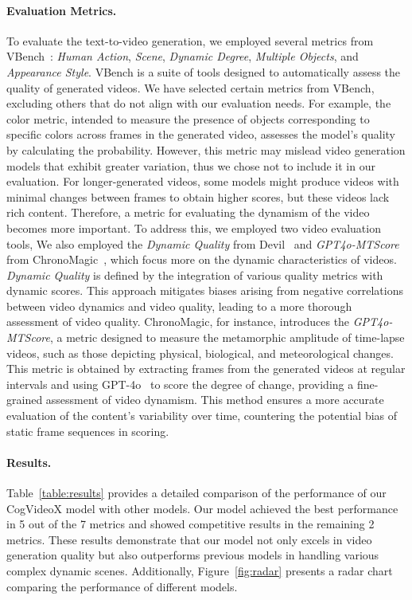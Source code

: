\paragraph{Evaluation Metrics.} To evaluate the text-to-video generation, we employed several metrics from VBench~\citep{huang2023vbench}: \emph{Human Action}, \emph{Scene}, \emph{Dynamic Degree}, \emph{Multiple Objects}, and \emph{Appearance Style}. VBench is a suite of tools designed to automatically assess the quality of generated videos. We have selected certain metrics from VBench, excluding others that do not align with our evaluation needs. For example, the color metric, intended to measure the presence of objects corresponding to specific colors across frames in the generated video, assesses the model's quality by calculating the probability. However, this metric may mislead video generation models that exhibit greater variation, thus we chose not to include it in our evaluation. For longer-generated videos, some models might produce videos with minimal changes between frames to obtain higher scores, but these videos lack rich content. Therefore, a metric for evaluating the dynamism of the video becomes more important. To address this, we employed two video evaluation tools, We also employed the \emph{Dynamic Quality} from Devil~\citep{liao2024evaluationtexttovideogenerationmodels} and \emph{GPT4o-MTScore} from ChronoMagic~\citep{yuan2024chronomagic}, which focus more on the dynamic characteristics of videos. \emph{Dynamic Quality} is defined by the integration of various quality metrics with dynamic scores. This approach mitigates biases arising from negative correlations between video dynamics and video quality, leading to a more thorough assessment of video quality. ChronoMagic, for instance, introduces the \emph{GPT4o-MTScore}, a metric designed to measure the metamorphic amplitude of time-lapse videos, such as those depicting physical, biological, and meteorological changes. This metric is obtained by extracting frames from the generated videos at regular intervals and using GPT-4o~\citep{gpt4o} to score the degree of change, providing a fine-grained assessment of video dynamism. This method ensures a more accurate evaluation of the content's variability over time, countering the potential bias of static frame sequences in scoring.



\paragraph{Results.} Table~\ref{table:results} provides a detailed comparison of the performance of our CogVideoX model with other models. Our model achieved the best performance in 5 out of the 7 metrics and showed competitive results in the remaining 2 metrics. These results demonstrate that our model not only excels in video generation quality but also outperforms previous models in handling various complex dynamic scenes. Additionally, Figure~\ref{fig:radar} presents a radar chart comparing the performance of different models.


